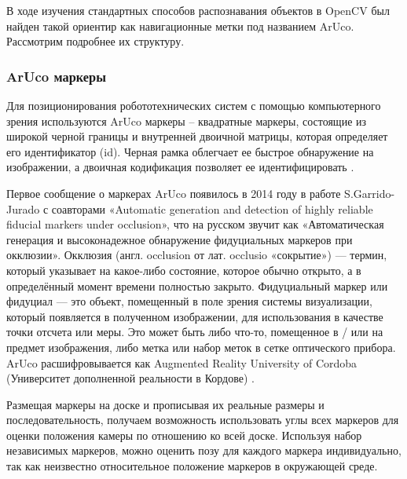 В ходе изучения стандартных способов распознавания объектов в Open\-CV был найден такой ориентир как навигационные метки под названием ArUco. Рассмотрим подробнее их структуру.

\subsubsection{ArUco маркеры}

Для позиционирования робототехнических систем с помощью компьютерного зрения используются ArUco маркеры -- квадратные маркеры, состоящие из широкой черной границы и внутренней двоичной матрицы, которая определяет его идентификатор (id). Черная рамка облегчает ее быстрое обнаружение на изображении, а двоичная кодификация позволяет ее идентифицировать \cite{opencv}.

Первое сообщение о маркерах ArUco появилось в 2014 году в работе S.Garrido-Jurado с соавторами «Automatic generation and detection of highly reliable fiducial markers under occlusion», что на русском звучит как «Автоматическая генерация и высоконадежное обнаружение фидуциальных маркеров при окклюзии».
Окклюзия (англ. occlusion от лат. occlusio «сокрытие») — термин, который указывает на какое-либо состояние, которое обычно открыто, а в определённый момент времени полностью закрыто.
Фидуциальный маркер или фидуциал — это объект, помещенный в поле зрения системы визуализации, который появляется в полученном изображении, для использования в качестве точки отсчета или меры. Это может быть либо что-то, помещенное в / или на предмет изображения, либо метка или набор меток в сетке оптического прибора.
ArUco расшифровывается как Augmented Reality University of Cordoba (Университет дополненной реальности в Кордове) \cite{aruco}.

Размещая маркеры на доске и прописывая их реальные размеры и последовательность, получаем возможность использовать углы всех маркеров для оценки положения камеры по отношению ко всей доске.
Используя набор независимых маркеров, можно оценить позу для каждого маркера индивидуально, так как неизвестно относительное положение маркеров в окружающей среде.

